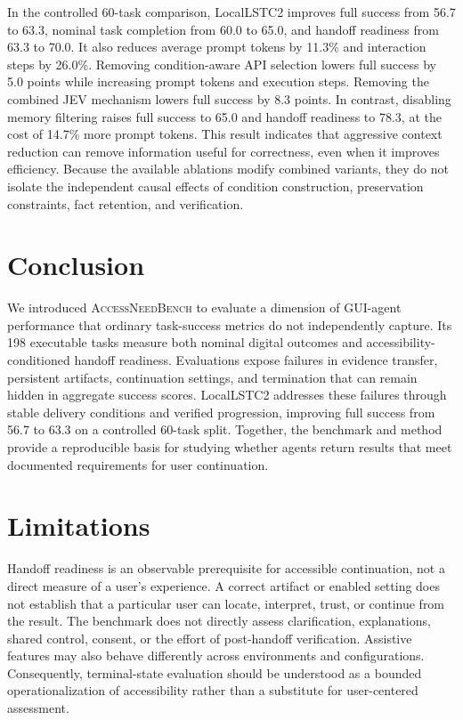 \documentclass[11pt]{article}
\newcommand{\bench}{\textsc{AccessNeedBench}\xspace}
\begin{document}
In the controlled 60-task comparison, LocalLSTC2 improves full success from 56.7 to 63.3, nominal task completion from 60.0 to 65.0, and handoff readiness from 63.3 to 70.0. It also reduces average prompt tokens by 11.3\% and interaction steps by 26.0\%. Removing condition-aware API selection lowers full success by 5.0 points while increasing prompt tokens and execution steps. Removing the combined JEV mechanism lowers full success by 8.3 points. In contrast, disabling memory filtering raises full success to 65.0 and handoff readiness to 78.3, at the cost of 14.7\% more prompt tokens. This result indicates that aggressive context reduction can remove information useful for correctness, even when it improves efficiency. Because the available ablations modify combined variants, they do not isolate the independent causal effects of condition construction, preservation constraints, fact retention, and verification.


\section{Conclusion}

We introduced \bench to evaluate a dimension of GUI-agent performance that ordinary task-success metrics do not independently capture. Its 198 executable tasks measure both nominal digital outcomes and accessibility-conditioned handoff readiness. Evaluations expose failures in evidence transfer, persistent artifacts, continuation settings, and termination that can remain hidden in aggregate success scores. LocalLSTC2 addresses these failures through stable delivery conditions and verified progression, improving full success from 56.7 to 63.3 on a controlled 60-task split. Together, the benchmark and method provide a reproducible basis for studying whether agents return results that meet documented requirements for user continuation.

\section{Limitations}

Handoff readiness is an observable prerequisite for accessible continuation, not a direct measure of a user's experience. A correct artifact or enabled setting does not establish that a particular user can locate, interpret, trust, or continue from the result. The benchmark does not directly assess clarification, explanations, shared control, consent, or the effort of post-handoff verification. Assistive features may also behave differently across environments and configurations. Consequently, terminal-state evaluation should be understood as a bounded operationalization of accessibility rather than a substitute for user-centered assessment.
\end{document}
